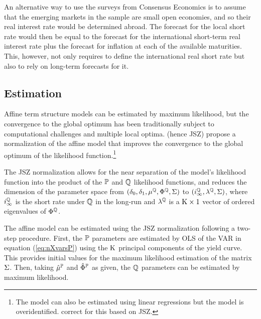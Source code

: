 {%
An alternative way to use the surveys from Consensus Economics is to assume that the emerging markets in the sample are small open economies, and so their real interest rate would be determined abroad. The forecast for the local short rate would then be equal to the forecast for the international short-term real interest rate plus the forecast for inflation at each of the available maturities. This, however, not only requires to define the international real short rate but also to rely on long-term forecasts for it.


\subsection{Estimation} \label{sec:Estimation}
\iftoggle{toclinks}{\gototoc}{} %
Affine term structure models can be estimated by maximum likelihood, but the convergence to the global optimum has been traditionally subject to computational challenges and multiple local optima.
\citet*{JSZ:2011} (hence JSZ) propose a normalization of the affine model that improves the convergence to the global optimum of the likelihood function.\footnote{ The model can also be estimated using linear regressions \citep*[see][]{ACM:2013} but the model is overidentified. \cite{GolinskiSpencer:2019} correct for this based on JSZ.} 

The JSZ normalization allows for the near separation of the model's likelihood function into the product of the \(\mathbb{P}\) and \(\mathbb{Q}\) likelihood functions, and reduces the dimension of the parameter space from \((\delta_{0}, \delta_{1}, \mu^{\mathbb{Q}}, \Phi^{\mathbb{Q}}, \Sigma)\) to \((i^{\mathbb{Q}}_{\infty}, \lambda^{\mathbb{Q}},\Sigma)\), where \(i^{\mathbb{Q}}_{\infty}\) is the short rate under \(\mathbb{Q}\) in the long-run and \(\lambda^{\mathbb{Q}}\) is a \(\mathrm{K} \times 1\) vector of ordered eigenvalues of \(\Phi^{\mathbb{Q}}\).

The affine model can be estimated using the JSZ normalization following a two-step procedure. 
First, the \(\mathbb{P}\) parameters are estimated by OLS of the VAR in equation (\ref{eq:nXvarsP}) using the \(\mathrm{K}\) principal components of the yield curve. This provides initial values for the maximum likelihood estimation of the matrix $\Sigma$. Then, taking \(\hat{\mu}^{\mathbb{P}}\) and \(\hat{\Phi}^{\mathbb{P}}\) as given, the \(\mathbb{Q}\) parameters can be estimated by maximum likelihood. 

}
